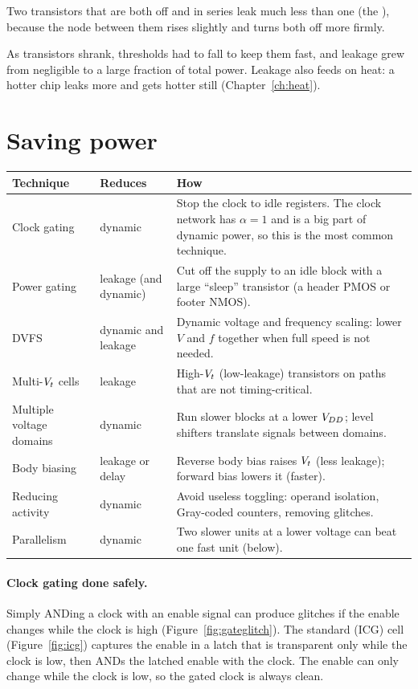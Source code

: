 Two transistors that are both off and in series leak much less than one (the ), because the node between them rises slightly and turns both off more firmly.

As transistors shrank, thresholds had to fall to keep them fast, and leakage grew from negligible to a large fraction of total power. Leakage also feeds on heat: a hotter chip leaks more and gets hotter still (Chapter~\ref{ch:heat}).

\section{Saving power}

\begin{center}
\begin{tabularx}{\linewidth}{>{\raggedright\arraybackslash}p{3.3cm}>{\raggedright\arraybackslash}p{2.3cm}>{\raggedright\arraybackslash}X}
\toprule
Technique & Reduces & How \\
\midrule
Clock gating & dynamic & Stop the clock to idle registers. The clock network has $\alpha = 1$ and is a big part of dynamic power, so this is the most common technique. \\
Power gating & leakage (and dynamic) & Cut off the supply to an idle block with a large ``sleep'' transistor (a header PMOS or footer NMOS). \\
DVFS & dynamic and leakage & Dynamic voltage and frequency scaling: lower $V$ and $f$ together when full speed is not needed. \\
Multi-$V_{t}$ cells & leakage & High-$V_{t}$ (low-leakage) transistors on paths that are not timing-critical. \\
Multiple voltage domains & dynamic & Run slower blocks at a lower $V_{DD}$; level shifters translate signals between domains. \\
Body biasing & leakage or delay & Reverse body bias raises $V_{t}$ (less leakage); forward bias lowers it (faster). \\
Reducing activity & dynamic & Avoid useless toggling: operand isolation, Gray-coded counters, removing glitches. \\
Parallelism & dynamic & Two slower units at a lower voltage can beat one fast unit (below). \\
\bottomrule
\end{tabularx}
\end{center}

\paragraph{Clock gating done safely.} Simply ANDing a clock with an enable signal can produce glitches if the enable changes while the clock is high (Figure~\ref{fig:gateglitch}). The standard  (ICG) cell (Figure~\ref{fig:icg}) captures the enable in a latch that is transparent only while the clock is low, then ANDs the latched enable with the clock. The enable can only change while the clock is low, so the gated clock is always clean.

